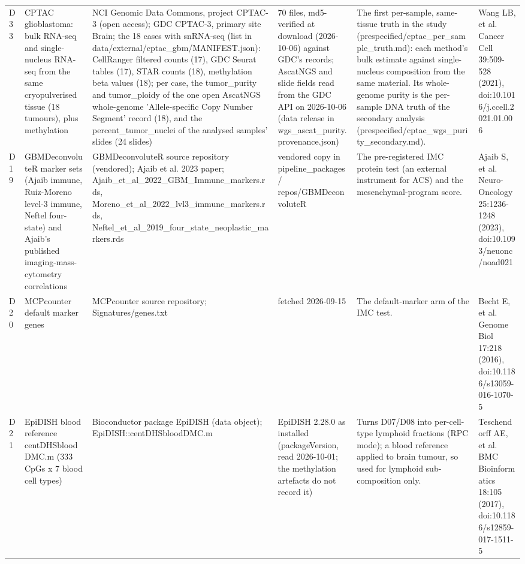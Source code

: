 \begin{table}[htbp]
\begin{tabular}{llllll}
D33 & CPTAC glioblastoma: bulk RNA-seq and single-nucleus RNA-seq from the same cryopulverised tissue (18 tumours), plus methylation & NCI Genomic Data Commons, project CPTAC-3 (open access); GDC CPTAC-3, primary site Brain; the 18 cases with snRNA-seq (list in data/external/cptac\_gbm/MANIFEST.json): CellRanger filtered counts (17), GDC Seurat tables (17), STAR counts (18), methylation beta values (18); per case, the tumor\_purity and tumor\_ploidy of the one open AscatNGS whole-genome 'Allele-specific Copy Number Segment' record (18), and the percent\_tumor\_nuclei of the analysed samples' slides (24 slides) & 70 files, md5-verified at download (2026-10-06) against GDC's records; AscatNGS and slide fields read from the GDC API on 2026-10-06 (data release in wgs\_ascat\_purity.provenance.json) & The first per-sample, same-tissue truth in the study (prespecified/cptac\_per\_sample\_truth.md): each method's bulk estimate against single-nucleus composition from the same material. Its whole-genome purity is the per-sample DNA truth of the secondary analysis (prespecified/cptac\_wgs\_purity\_secondary.md). & Wang LB, et al. Cancer Cell 39:509-528 (2021), doi:10.1016/j.ccell.2021.01.006 \\
D19 & GBMDeconvoluteR marker sets (Ajaib immune, Ruiz-Moreno level-3 immune, Neftel four-state) and Ajaib's published imaging-mass-cytometry correlations & GBMDeconvoluteR source repository (vendored); Ajaib et al. 2023 paper; Ajaib\_et\_al\_2022\_GBM\_Immune\_markers.rds, Moreno\_et\_al\_2022\_lvl3\_immune\_markers.rds, Neftel\_et\_al\_2019\_four\_state\_neoplastic\_markers.rds & vendored copy in pipeline\_packages / repos/GBMDeconvoluteR & The pre-registered IMC protein test (an external instrument for ACS) and the mesenchymal-program score. & Ajaib S, et al. Neuro-Oncology 25:1236-1248 (2023), doi:10.1093/neuonc/noad021 \\
D20 & MCPcounter default marker genes & MCPcounter source repository; Signatures/genes.txt & fetched 2026-09-15 & The default-marker arm of the IMC test. & Becht E, et al. Genome Biol 17:218 (2016), doi:10.1186/s13059-016-1070-5 \\
D21 & EpiDISH blood reference centDHSbloodDMC.m (333 CpGs x 7 blood cell types) & Bioconductor package EpiDISH (data object); EpiDISH::centDHSbloodDMC.m & EpiDISH 2.28.0 as installed (packageVersion, read 2026-10-01; the methylation artefacts do not record it) & Turns D07/D08 into per-cell-type lymphoid fractions (RPC mode); a blood reference applied to brain tumour, so used for lymphoid sub-composition only. & Teschendorff AE, et al. BMC Bioinformatics 18:105 (2017), doi:10.1186/s12859-017-1511-5 \\

\end{tabular}
\end{table}
